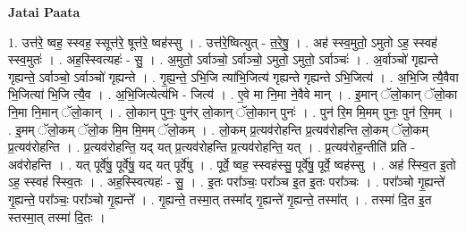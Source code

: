 \documentclass[17pt]{extarticle}
\begin{document}
\textbf{Jatai Paata} \newline

1. उत्त॑रे॒ ष्वह॒ स्स्वह॒ स्सूत्त॑रे॒ षूत्त॑रे॒ ष्वह॑स्सु । . उत्त॑रे॒ष्वित्युत् - त॒रे॒षु॒ । . अह॑ स्स्व॒मुतो॒ ऽमुतो ऽह॒ स्स्वह॑ स्स्व॒मुतः॑ । . अह॒स्स्वित्यहः॑ - सु॒ । . अ॒मुतो॒ ऽर्वाञ्चो॒ ऽर्वाञ्चो॒ ऽमुतो॒ ऽमुतो॒ ऽर्वाञ्चः॑ । . अ॒र्वाञ्चो॑ गृह्यन्ते गृह्यन्ते॒ ऽर्वाञ्चो॒ ऽर्वाञ्चो॑ गृह्यन्ते । . गृ॒ह्य॒न्ते॒ ऽभि॒जि त्या॑भि॒जित्य॑ गृह्यन्ते गृह्यन्ते ऽभि॒जित्य॑ । . अ॒भि॒जि त्यै॒वैवा भि॒जित्या॑ भि॒जि त्यै॒व । . अ॒भि॒जित्येत्य॑भि - जित्य॑ । . ए॒वे मा नि॒मा ने॒वैवे मान् । . इ॒मान् ॅलो॒कान् ॅलो॒का नि॒मा नि॒मान् ॅलो॒कान् । . लो॒कान् पुनः॒ पुन॑र् लो॒कान् ॅलो॒कान् पुनः॑ । . पुन॑ रि॒म मि॒मम् पुनः॒ पुन॑ रि॒मम् । . इ॒मम् ॅलो॒कम् ॅलो॒क मि॒म मि॒मम् ॅलो॒कम् । . लो॒कम् प्र॒त्यव॑रोहन्ति प्र॒त्यव॑रोहन्ति लो॒कम् ॅलो॒कम् प्र॒त्यव॑रोहन्ति । . प्र॒त्यव॑रोहन्ति॒ यद् यत् प्र॒त्यव॑रोहन्ति प्र॒त्यव॑रोहन्ति॒ यत् । . प्र॒त्यव॑रोह॒न्तीति॑ प्रति - अव॑रोहन्ति । . यत् पूर्वे॑षु॒ पूर्वे॑षु॒ यद् यत् पूर्वे॑षु । . पूर्वे॒ ष्वह॒ स्स्वह॑स्सु॒ पूर्वे॑षु॒ पूर्वे॒ ष्वह॑स्सु । . अह॑ स्स्वि॒त इ॒तो ऽह॒ स्स्वह॑ स्स्वि॒तः । . अह॒स्स्वित्यहः॑ - सु॒ । . इ॒तः परा᳚ञ्चः॒ परा᳚ञ्च इ॒त इ॒तः परा᳚ञ्चः । . परा᳚ञ्चो गृ॒ह्यन्ते॑ गृ॒ह्यन्ते॒ परा᳚ञ्चः॒ परा᳚ञ्चो गृ॒ह्यन्ते᳚ । . गृ॒ह्यन्ते॒ तस्मा॒त् तस्मा᳚द् गृ॒ह्यन्ते॑ गृ॒ह्यन्ते॒ तस्मा᳚त् । . तस्मा॑ दि॒त इ॒त स्तस्मा॒त् तस्मा॑ दि॒तः । \newline
\end{document}
